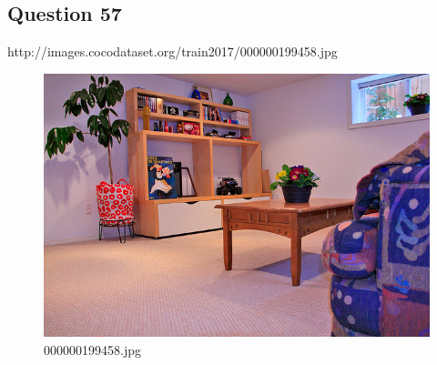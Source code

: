 \subsection*{Question 57}
http://images.cocodataset.org/train2017/000000199458.jpg
\begin{figure}[h]
    \centering
    \includegraphics[width=0.8\linewidth]{../image set/hard/000000199458.jpg}
    \caption{000000199458.jpg}
\end{figure}
